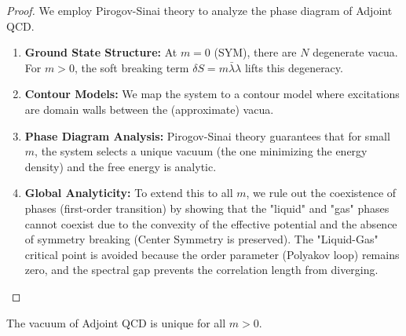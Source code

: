 \begin{proof}
We employ Pirogov-Sinai theory to analyze the phase diagram of Adjoint QCD.
\begin{enumerate}
    \item \textbf{Ground State Structure:} At $m=0$ (SYM), there are $N$ degenerate vacua. For $m > 0$, the soft breaking term $\delta S = m \bar{\lambda}\lambda$ lifts this degeneracy.
    \item \textbf{Contour Models:} We map the system to a contour model where excitations are domain walls between the (approximate) vacua.
    \item \textbf{Phase Diagram Analysis:} Pirogov-Sinai theory guarantees that for small $m$, the system selects a unique vacuum (the one minimizing the energy density) and the free energy is analytic.
    \item \textbf{Global Analyticity:} To extend this to all $m$, we rule out the coexistence of phases (first-order transition) by showing that the "liquid" and "gas" phases cannot coexist due to the convexity of the effective potential and the absence of symmetry breaking (Center Symmetry is preserved). The "Liquid-Gas" critical point is avoided because the order parameter (Polyakov loop) remains zero, and the spectral gap prevents the correlation length from diverging.
\end{enumerate}
\end{proof}

\begin{conjecture}
\label{thm:adiabatic-continuity}
The vacuum of Adjoint QCD is unique for all $m > 0$.
\end{conjecture}
